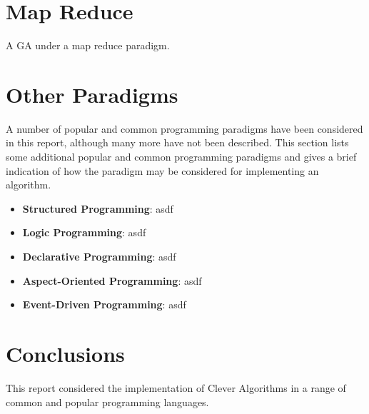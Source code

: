 \documentclass[a4paper, 11pt]{article}
\begin{document}
\section{Map Reduce}
A GA under a map reduce paradigm.

\section{Other Paradigms}
A number of popular and common programming paradigms have been considered in this report, although many more have not been described. This section lists some additional popular and common programming paradigms and gives a brief indication of how the paradigm may be considered for implementing an algorithm.

\begin{itemize}
	\item \textbf{Structured Programming}: asdf
	\item \textbf{Logic Programming}: asdf
	\item \textbf{Declarative Programming}: asdf
	\item \textbf{Aspect-Oriented Programming}: asdf
	\item \textbf{Event-Driven Programming}: asdf
\end{itemize}

\section{Conclusions}
\label{sec:conclusions}
This report considered the implementation of Clever Algorithms in a range of common and popular programming languages. 




\end{document}
